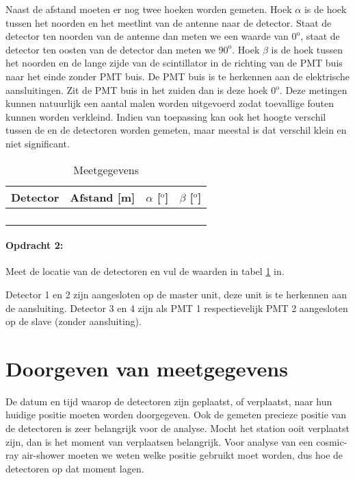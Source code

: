 Naast de afstand moeten er nog twee hoeken worden gemeten. Hoek $\alpha$
is de hoek tussen het noorden en het meetlint van de \gps antenne naar de
detector. Staat de detector ten noorden van de \gps antenne dan meten we
een waarde van $0^{\mathrm{o}}$, staat de detector ten oosten van de
detector dan meten we $90^{\mathrm{o}}$. Hoek $\beta$ is de hoek tussen
het noorden en de lange zijde van de scintillator in de richting van de
PMT buis naar het einde zonder PMT buis. De PMT buis is te herkennen aan
de elektrische aansluitingen. Zit de PMT buis in het zuiden dan is deze
hoek $0\mathrm{^{o}}$. Deze metingen kunnen natuurlijk een aantal malen
worden uitgevoerd zodat toevallige fouten kunnen worden verkleind. Indien
van toepassing kan ook het hoogte verschil tussen de \gps en de detectoren
worden gemeten, maar meestal is dat verschil klein en niet significant.

\begin{table}[h]
    \centering
    \begin{tabular}{|>{\centering}p{3.5cm}|>{\centering}p{3.5cm}|>{\centering}p{3.5cm}|>{\centering}p{3.5cm}|}
        \hline 
        Detector & Afstand {[}m{]} & $\alpha$ {[}$^{\mathrm{o}}${]} & $\beta$ {[}$^{\mathrm{o}}${]}\tabularnewline
        \hline 
        \hline 
        1 &  &  & \tabularnewline
        \hline 
        2 &  &  & \tabularnewline
        \hline 
        3 &  &  & \tabularnewline
        \hline 
        4 &  &  & \tabularnewline
        \hline 
    \end{tabular}

\caption{\label{tab:Meetgegevens}Meetgegevens}
\end{table}

\paragraph{Opdracht 2:}

Meet de locatie van de detectoren en vul de waarden in tabel
\ref{tab:Meetgegevens} in.

Detector 1 en 2 zijn aangesloten op de \hisparc master unit, deze unit is
te herkennen aan de \gps aansluiting. Detector 3 en 4 zijn als PMT 1
respectievelijk PMT 2 aangesloten op de \hisparc slave (zonder
\gps aansluiting).


\section{Doorgeven van meetgegevens}

De datum en tijd waarop de detectoren zijn geplaatst, of verplaatst,
naar hun huidige positie moeten worden doorgegeven. Ook de gemeten
precieze positie van de detectoren is zeer belangrijk voor de analyse.
Mocht het station ooit verplaatst zijn, dan is het moment van
verplaatsen belangrijk. Voor analyse van een cosmic-ray air-shower
moeten we weten welke positie gebruikt moet worden, dus hoe de
detectoren op dat moment lagen.

